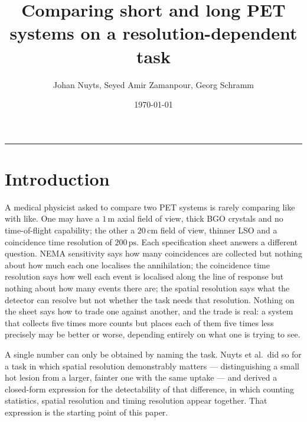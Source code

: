 \documentclass[11pt,a4paper]{article}
\title{Comparing short and long PET systems on a resolution-dependent task}
\author{Johan Nuyts, Seyed Amir Zamanpour, Georg Schramm}
\date{\today}
\begin{document}
\maketitle
\vspace{-9ex}
\begin{center}\rule{0.35\textwidth}{0.4pt}\end{center}
\vspace{2ex}

\section{Introduction}
\label{sec:intro}

A medical physicist asked to compare two PET systems is rarely comparing like with like.
One may have a $1\,\mathrm{m}$ axial field of view, thick BGO crystals and no
time-of-flight capability; the other a $20\,\mathrm{cm}$ field of view, thinner LSO and a
coincidence time resolution of $200\,\mathrm{ps}$. Each specification sheet answers a
different question. NEMA sensitivity says how many coincidences are collected but nothing
about how much each one localises the annihilation; the coincidence time resolution says how
well each event is localised along the line of response but nothing about how many events
there are; the spatial resolution says what the detector can resolve but not whether the
task needs that resolution. Nothing on the sheet says how to trade one against another, and
the trade is real: a system that collects five times more counts but places each of them
five times less precisely may be better or worse, depending entirely on what one is trying
to see.

A single number can only be obtained by naming the task. Nuyts et al.\ did so for a task in
which spatial resolution demonstrably matters --- distinguishing a small hot lesion from a
larger, fainter one with the same uptake --- and derived a closed-form expression for the
detectability of that difference, in which counting statistics, spatial resolution and
timing resolution appear together. That expression is the starting point of this paper.
\end{document}
